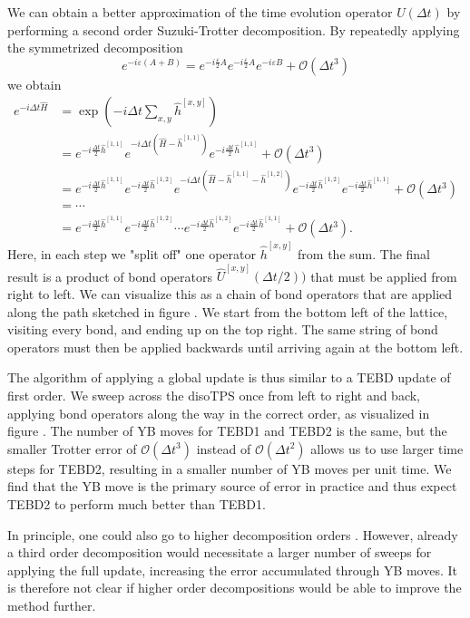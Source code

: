 We can obtain a better approximation of the time evolution operator $U(\Delta t)$ by performing a second order Suzuki-Trotter decomposition. By repeatedly applying the symmetrized decomposition
\begin{equation}
	e^{-i\varepsilon(A+B)} = e^{-i\frac{\varepsilon}{2}A}e^{-i\frac{\varepsilon}{2}A}e^{-i\varepsilon B} + \mathcal{O}(\Delta t^3)
\end{equation}
we obtain
\begin{equation}
	\begin{split}
		\label{eq:disoTPS_tebd_second_order_suzuki_trotter_decomposition}
		e^{-i\Delta t\hat{H}} &= \exp\left(-i\Delta t\sum_{x,y}\hat{h}^{[x,y]}\right) \\
		&= e^{-i\frac{\Delta t}{2}\hat{h}^{[1, 1]}} e^{-i\Delta t\left(\hat{H}-\hat{h}^{[1,1]}\right)} e^{-i\frac{\Delta t}{2}\hat{h}^{[1, 1]}} + \mathcal{O}(\Delta t^3)\\
		&= e^{-i\frac{\Delta t}{2}\hat{h}^{[1, 1]}} e^{-i\frac{\Delta t}{2}\hat{h}^{[1, 2]}} e^{-i\Delta t\left(\hat{H}-\hat{h}^{[1,1]}-\hat{h}^{[1, 2]}\right)} e^{-i\frac{\Delta t}{2}\hat{h}^{[1, 2]}} e^{-i\frac{\Delta t}{2}\hat{h}^{[1, 1]}} + \mathcal{O}(\Delta t^3)\\
		&=\cdots\\
		&= e^{-i\frac{\Delta t}{2}\hat{h}^{[1, 1]}} e^{-i\frac{\Delta t}{2}\hat{h}^{[1, 2]}} \cdots e^{-i\frac{\Delta t}{2}\hat{h}^{[1, 2]}} e^{-i\frac{\Delta t}{2}\hat{h}^{[1, 1]}} + \mathcal{O}(\Delta t^3).
	\end{split}
\end{equation}
Here, in each step we "split off" one operator $\hat{h}^{[x,y]}$ from the sum. The final result is a product of bond operators $\hat{U}^{[x,y]}(\Delta t/2))$ that must be applied from right to left. We can visualize this as a chain of bond operators that are applied along the path sketched in figure . We start from the bottom left of the lattice, visiting every bond, and ending up on the top right. The same string of bond operators must then be applied backwards until arriving again at the bottom left. \par
The algorithm of applying a global update is thus similar to a TEBD update of first order. We sweep across the disoTPS once from left to right and back, applying bond operators along the way in the correct order, as visualized in figure . The number of YB moves for TEBD1 and TEBD2 is the same, but the smaller Trotter error of $\mathcal{O}(\Delta t^3)$ instead of $\mathcal{O}(\Delta t^2)$ allows us to use larger time steps for TEBD2, resulting in a smaller number of YB moves per unit time. We find that the YB move is the primary source of error in practice and thus expect TEBD2 to perform much better than TEBD1. \par 
In principle, one could also go to higher decomposition orders \cite{cite:finding_exponential_product_formulas_of_higher_orders}. However, already a third order decomposition would necessitate a larger number of sweeps for applying the full update, increasing the error accumulated through YB moves. It is therefore not clear if higher order decompositions would be able to improve the method further.
